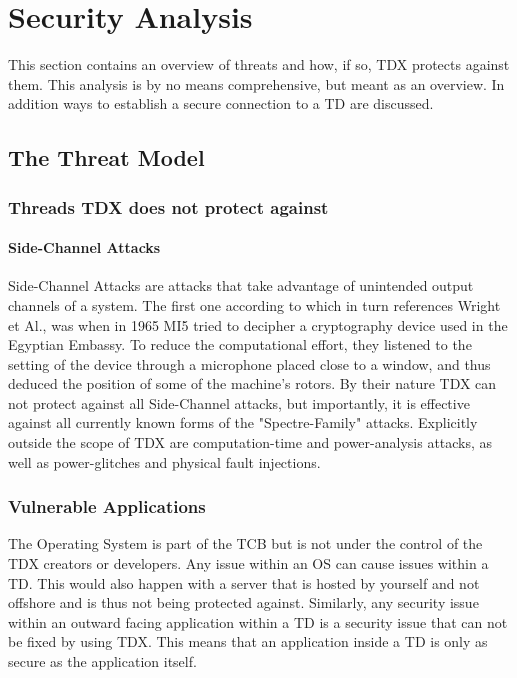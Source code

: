 
\chapter{Security Analysis}
\label{Security Analysis}

This section contains an overview of threats and how, if so, TDX protects against them. This analysis is by no means comprehensive, but meant as an overview. In addition ways to establish a secure connection to a TD are discussed.
\section{The Threat Model}


\subsection{Threads TDX does not protect against}

\subsubsection{Side-Channel Attacks}

Side-Channel Attacks are attacks that take advantage of unintended output channels of a system. The first one according to \cite{zhou_side-channel_nodate} which in turn references Wright et Al., was when in 1965 MI5 tried to decipher a cryptography device used in the Egyptian Embassy. To reduce the computational effort, they listened to the setting of the device through a microphone placed close to a window, and thus deduced the position of some of the machine's rotors.
By their nature TDX can not protect against all Side-Channel attacks, but importantly, it is effective against all currently known forms of the "Spectre-Family" attacks. Explicitly outside the scope of TDX are computation-time and power-analysis attacks, as well as power-glitches and physical fault injections.

\subsection{Vulnerable Applications}

The Operating System is part of the \Gls{TCB} but is not under the control of the TDX creators or developers. Any issue within an \Gls{OS} can cause issues within a \Gls{TD}. This would also happen with a server that is hosted by yourself and not offshore and is thus not being protected against. Similarly, any security issue within an outward facing application within a \Gls{TD} is a security issue that can not be fixed by using TDX. This means that an application inside a TD is only as secure as the application itself. 

